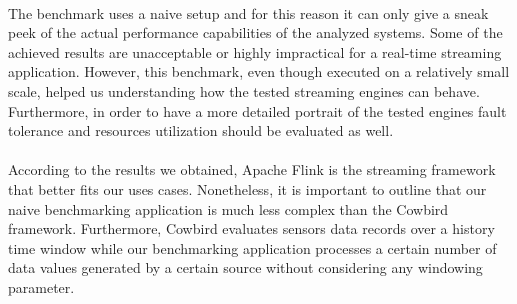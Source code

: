 \paragraph{}
The benchmark uses a naive setup and for this reason it can only give a sneak peek of the actual performance capabilities of the analyzed systems. Some of the achieved results are unacceptable or highly impractical for a real-time streaming application. However, this benchmark, even though executed on a relatively small scale, helped us understanding how the tested streaming engines can behave. Furthermore, in order to have a more detailed portrait of the tested engines fault tolerance and resources utilization should be evaluated as well. 
\paragraph{}
According to the results we obtained, Apache Flink is the streaming framework that better fits our uses cases. Nonetheless, it is important to outline that our naive benchmarking application is much less complex than the Cowbird framework. Furthermore, Cowbird evaluates sensors data records over a history time window while our benchmarking application processes a certain number of data values generated by a certain source without considering any windowing parameter.


%
